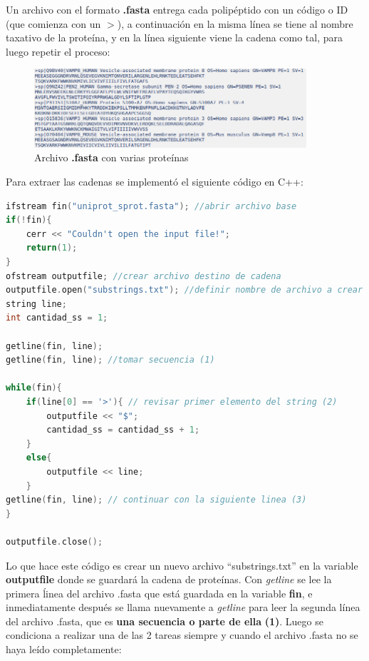 Un archivo con el formato \textbf{.fasta} entrega cada polipéptido con un código o ID (que comienza con un $>$), a continuación en la misma línea se tiene al nombre taxativo de la proteína, y en la línea siguiente viene la cadena como tal, para luego repetir el proceso:

\begin{figure}[h]
    \centering
    \includegraphics[width=0.9\textwidth]{./images/fastadefecto2.png}
    \caption{Archivo \textbf{.fasta} con varias proteínas}
    \label{fig:image5}
\end{figure}

Para extraer las cadenas se implementó el siguiente código en C++:

\begin{lstlisting}[language=C++, caption=Creación de cadena de proteínas.]
ifstream fin("uniprot_sprot.fasta"); //abrir archivo base
if(!fin){
	cerr << "Couldn't open the input file!";
	return(1);
}
ofstream outputfile; //crear archivo destino de cadena
outputfile.open("substrings.txt"); //definir nombre de archivo a crear
string line; 
int cantidad_ss = 1;

getline(fin, line); 
getline(fin, line); //tomar secuencia (1)

while(fin){
	if(line[0] == '>'){ // revisar primer elemento del string (2)
		outputfile << "$";
		cantidad_ss = cantidad_ss + 1;
	}
	else{
		outputfile << line;
	}
getline(fin, line); // continuar con la siguiente linea (3)
}

outputfile.close();
\end{lstlisting}

Lo que hace este código es crear un nuevo archivo ``substrings.txt'' en la variable \textbf{outputfile} donde se guardará la cadena de proteínas. Con \textit{getline} se lee la primera ĺinea del archivo .fasta que está guardada en la variable \textbf{fin}, e inmediatamente después se llama nuevamente a \textit{getline} para leer la segunda línea del archivo .fasta, que es \textbf{una secuencia o parte de ella} \textbf{(1)}. Luego se condiciona a realizar una de las 2 tareas siempre y cuando el archivo .fasta no se haya leído completamente: 

